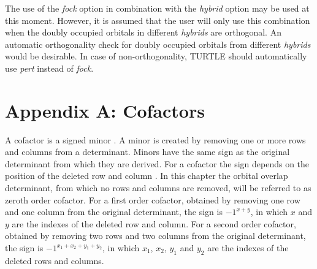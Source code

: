 The use of the \textit{fock} option in combination with the \textit{hybrid} option may be used at this moment. However, it is assumed that the user will only use this combination when the doubly occupied orbitals in different \textit{hybrids} are orthogonal. An automatic orthogonality check for doubly occupied orbitals from different \textit{hybrids} would be desirable. In case of non-orthogonality, TURTLE should automatically use \textit{pert} instead of \textit{fock}. 

\section*{Appendix A: Cofactors}

A cofactor is a signed minor \cite{aitken}. A minor is created by removing one or more rows and columns from a determinant. Minors have the same sign as the original determinant from which they are derived. For a cofactor the sign depends on the position of the deleted row and column \cite{fokkeproef}. In this chapter the orbital overlap determinant, from which no rows and columns are removed, will be referred to as zeroth order cofactor. For a first order cofactor, obtained by removing one row and one column from the original determinant, the sign is $-1^{x+y}$, in which $x$ and $y$ are the indexes of the deleted row and column. For a second order cofactor, obtained by removing two rows and two columns from the original determinant, the sign is $-1^{x_1+x_2+y_1+y_2}$, in which $x_1$, $x_2$, $y_1$ and $y_2$ are the indexes of the deleted rows and columns. 

